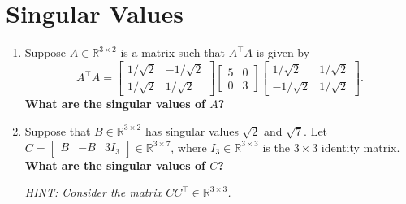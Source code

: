 \documentclass[10pt]{article}
\newcommand{\RR}{\mathbb{R}}
\begin{document}
\section{Singular Values}

\begin{enumerate}[label=(\alph*)]
\item Suppose $A \in \RR^{3 \times 2}$ is a matrix such that $A^\top A$ is given by
\begin{equation}
A^\top A = \begin{bmatrix} 1/\sqrt{2} & -1/\sqrt{2} \\ 1/\sqrt{2} & 1/\sqrt{2} \end{bmatrix} \begin{bmatrix} 5 & 0 \\ 0 & 3 \end{bmatrix} \begin{bmatrix} 1/\sqrt{2} & 1/\sqrt{2} \\ -1/\sqrt{2} & 1/\sqrt{2} \end{bmatrix}.
\end{equation}
\textbf{What are the singular values of $A$?}

\vspace{6cm}

\item Suppose that $B \in \RR^{3 \times 2}$ has singular values $\sqrt{2}$ and $\sqrt{7}$. Let $C = \begin{bmatrix} B & -B & 3I_3 \end{bmatrix} \in \RR^{3 \times 7}$, where $I_3 \in \RR^{3 \times 3}$ is the $3 \times 3$ identity matrix. \textbf{What are the singular values of $C$?}

\emph{HINT: Consider the matrix $CC^\top \in \RR^{3 \times 3}$.}

\vspace{6cm}

\end{enumerate}
\end{document}
